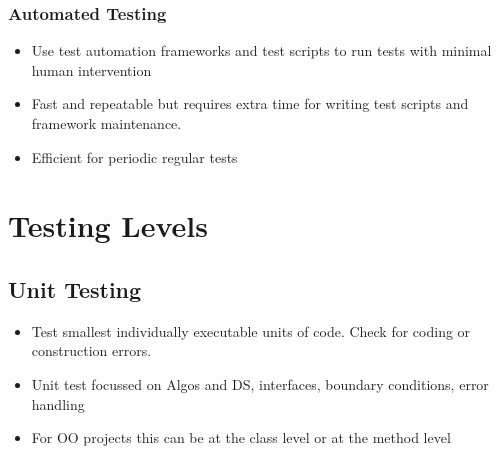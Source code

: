 \documentclass{article}
\begin{document}
\subsubsection{Automated Testing}
\begin{itemize}
    \item Use test automation frameworks and test scripts to run tests with minimal human intervention
    
    \item Fast and repeatable but requires extra time for writing test scripts and framework maintenance.
    
    \item Efficient for periodic regular tests
\end{itemize}

\section{Testing Levels}
\subsection{Unit Testing}
\begin{itemize}
    \item Test smallest individually executable units of code. Check for coding or construction errors. 
    
    \item Unit test focussed on Algos and DS, interfaces, boundary conditions, error handling
    
    \item For OO projects this can be at the class level or at the method level
\end{itemize}
\end{document}
